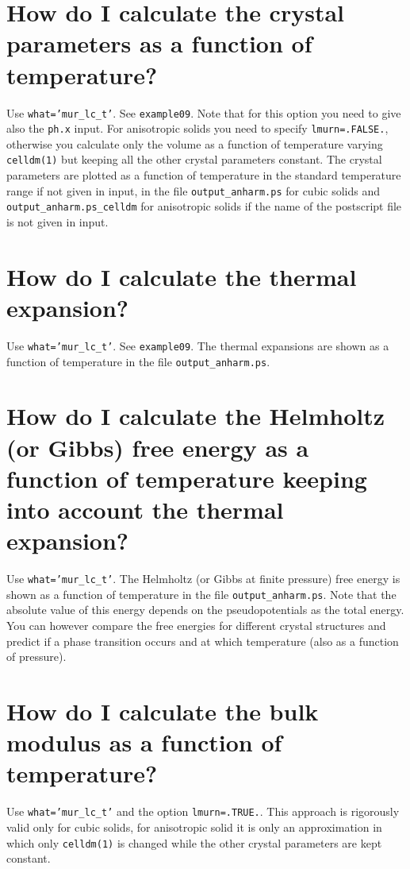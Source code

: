 \documentclass[12pt,a4paper]{article}
\begin{document}
\section{\color{coral} How do I calculate the crystal parameters as a function
of temperature?}
Use \texttt{what='mur\_lc\_t'}. See \texttt{example09}. Note that
for this option you need to give also the \texttt{ph.x} input.
For anisotropic solids you need to specify \texttt{lmurn=.FALSE.},
otherwise you calculate only the volume as a function of temperature
varying \texttt{celldm(1)} but keeping all the other crystal parameters
constant. The crystal parameters are plotted as a function of temperature
in the standard temperature range if not given in input, in the file 
\texttt{output\_anharm.ps} for cubic solids and
\texttt{output\_anharm.ps\_celldm} for anisotropic
solids if the name of the postscript file is not given in input.

\section{\color{coral} How do I calculate the thermal expansion?}
Use \texttt{what='mur\_lc\_t'}. See \texttt{example09}. The thermal expansions
are shown as a function of temperature in the file \texttt{output\_anharm.ps}.

\section{\color{coral}How do I calculate the Helmholtz (or Gibbs) free energy
as a function of temperature keeping into account the thermal expansion?}
Use \texttt{what='mur\_lc\_t'}. The Helmholtz (or Gibbs at finite pressure) 
free energy is shown as a function of temperature in the file 
\texttt{output\_anharm.ps}. Note that the absolute value of this energy
depends on the pseudopotentials as the total energy. You can however
compare the free energies for different crystal structures 
and predict if a phase transition occurs and at which temperature (also 
as a function of pressure).

\section{\color{coral} How do I calculate the bulk modulus as a function of 
temperature?}
Use \texttt{what='mur\_lc\_t'} and the option \texttt{lmurn=.TRUE.}.
This approach is rigorously valid only for cubic solids, for anisotropic
solid it is only an approximation in which only \texttt{celldm(1)} is
changed while the other crystal parameters are kept constant.
\end{document}
